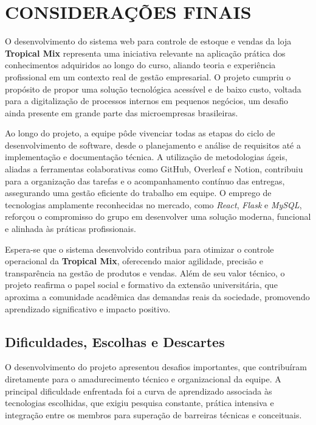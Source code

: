 \chapter{CONSIDERAÇÕES FINAIS}

O desenvolvimento do sistema web para controle de estoque e vendas da loja \textbf{Tropical Mix} representa uma iniciativa relevante na aplicação prática dos conhecimentos adquiridos ao longo do curso, aliando teoria e experiência profissional em um contexto real de gestão empresarial. O projeto cumpriu o propósito de propor uma solução tecnológica acessível e de baixo custo, voltada para a digitalização de processos internos em pequenos negócios, um desafio ainda presente em grande parte das microempresas brasileiras.

Ao longo do projeto, a equipe pôde vivenciar todas as etapas do ciclo de desenvolvimento de software, desde o planejamento e análise de requisitos até a implementação e documentação técnica. A utilização de metodologias ágeis, aliadas a ferramentas colaborativas como GitHub, Overleaf e Notion, contribuiu para a organização das tarefas e o acompanhamento contínuo das entregas, assegurando uma gestão eficiente do trabalho em equipe. O emprego de tecnologias amplamente reconhecidas no mercado, como \textit{React}, \textit{Flask} e \textit{MySQL}, reforçou o compromisso do grupo em desenvolver uma solução moderna, funcional e alinhada às práticas profissionais.

Espera-se que o sistema desenvolvido contribua para otimizar o controle operacional da \textbf{Tropical Mix}, oferecendo maior agilidade, precisão e transparência na gestão de produtos e vendas. Além de seu valor técnico, o projeto reafirma o papel social e formativo da extensão universitária, que aproxima a comunidade acadêmica das demandas reais da sociedade, promovendo aprendizado significativo e impacto positivo.

\section{Dificuldades, Escolhas e Descartes}

O desenvolvimento do projeto apresentou desafios importantes, que contribuíram diretamente para o amadurecimento técnico e organizacional da equipe. A principal dificuldade enfrentada foi a curva de aprendizado associada às tecnologias escolhidas, que exigiu pesquisa constante, prática intensiva e integração entre os membros para superação de barreiras técnicas e conceituais.

